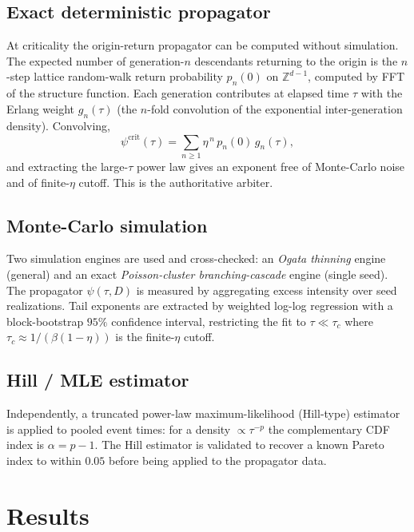 \documentclass[11pt,a4paper]{article}
\begin{document}
\subsection{Exact deterministic propagator}

At criticality the origin-return propagator can be computed without simulation. The expected number of generation-$n$ descendants returning to the origin is the $n$-step lattice random-walk return probability $p_n(0)$ on $\mathbb{Z}^{d-1}$, computed by FFT of the structure function. Each generation contributes at elapsed time $\tau$ with the Erlang weight $g_n(\tau)$ (the $n$-fold convolution of the exponential inter-generation density). Convolving,
\begin{equation}
\psi^{\mathrm{crit}}(\tau) = \sum_{n\ge1} \eta^{\,n}\, p_n(0)\, g_n(\tau),
\end{equation}
and extracting the large-$\tau$ power law gives an exponent free of Monte-Carlo noise and of finite-$\eta$ cutoff. This is the authoritative arbiter.

\subsection{Monte-Carlo simulation}

Two simulation engines are used and cross-checked: an \emph{Ogata thinning} engine (general) and an exact \emph{Poisson-cluster branching-cascade} engine (single seed). The propagator $\psi(\tau,D)$ is measured by aggregating excess intensity over seed realizations. Tail exponents are extracted by weighted log-log regression with a block-bootstrap $95\%$ confidence interval, restricting the fit to $\tau\ll\tau_c$ where $\tau_c\approx 1/(\beta(1-\eta))$ is the finite-$\eta$ cutoff.

\subsection{Hill / MLE estimator}

Independently, a truncated power-law maximum-likelihood (Hill-type) estimator is applied to pooled event times: for a density $\propto\tau^{-p}$ the complementary CDF index is $\alpha=p-1$. The Hill estimator is validated to recover a known Pareto index to within $0.05$ before being applied to the propagator data.

\section{Results}
\end{document}
